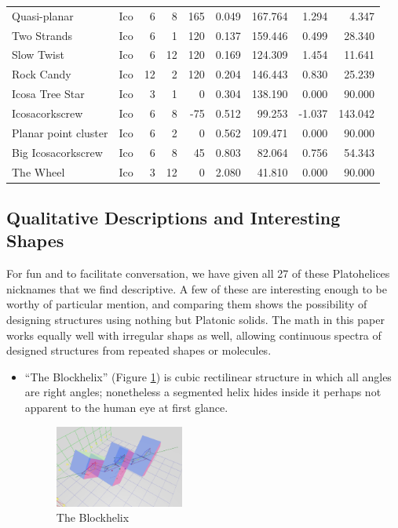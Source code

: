 \documentclass[11pt]{article}
\begin{document}
{\begin{table}[ht]
\begin{tabular}{l l r r r r r r r}
Quasi-planar & Ico &	6 &	8 &	165 &	0.049 &	167.764 & 1.294 & 4.347 \\
Two Strands & Ico &	6 &	1 &	120 &	0.137 &	159.446	& 0.499 & 28.340 \\
Slow Twist & Ico &	6 &	12 &	120 &	0.169 &	124.309	& 1.454	& 11.641 \\
Rock Candy & Ico &	12 &	2 &	120 &	0.204 &	146.443	& 0.830 & 25.239 \\
Icosa Tree Star & Ico &	3 &	1 &	0 &	0.304 &	138.190	& 0.000	& 90.000 \\
Icosacorkscrew & Ico &	6 &	8 &	-75 &	0.512 &	99.253	& -1.037 & 143.042 \\
Planar point cluster & Ico &	6 &	2 &	0 &	0.562 &	109.471 & 0.000 & 90.000 \\
Big Icosacorkscrew  & Ico &	6 &	8 &	45 &	0.803 &	82.064 & 0.756 & 54.343 \\
The Wheel & Ico &	3 &	12 &	0 &	2.080 &	41.810 & 0.000 & 90.000 \\
\hline %
\end{tabular}
\label{table:platonic} %
\end{table}

\subsection{Qualitative Descriptions and Interesting Shapes}

For fun and to facilitate conversation, we have given all 27 of these Platohelices nicknames that we find descriptive.
A few of these are interesting enough
to be worthy of particular mention, and comparing them shows the possibility of designing structures using nothing but Platonic solids.
The math in this paper works equally well with irregular shaps as well, allowing continuous spectra of designed structures from repeated shapes
or molecules.

\begin{itemize}
\item ``The Blockhelix'' (Figure \ref{fig:blockhelix}) is cubic rectilinear structure in which all angles are right angles; nonetheless
  a segmented helix hides inside it perhaps not apparent to the human eye at first glance.
\begin{figure}
     \centering
     \includegraphics[width=0.40\textwidth]{figures/Blockhelix.png}
     \caption{The Blockhelix}
  \label{fig:blockhelix}
\end{figure}


\end{itemize}}
\end{document}
